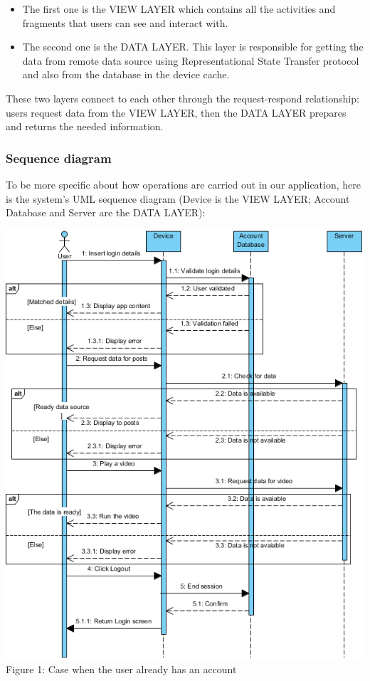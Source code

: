 \begin{itemize}
  \item The first one is the VIEW LAYER which contains all the activities and fragments that users can see and interact with.
  \item The second one is the DATA LAYER. This layer is responsible for getting the data from remote data source using Representational State Transfer protocol and also from the database in the device cache.
\end{itemize}

\vspace{0cm}These two layers connect to each other through the request-respond relationship: users request data from the VIEW LAYER, then the DATA LAYER prepares and returns the needed information.
\subsubsection{Sequence diagram}
\hspace{0.5cm}To be more specific about how operations are carried out in our application, here is the system’s UML sequence diagram (Device is the VIEW LAYER; Account Database and Server are the DATA LAYER):


\newpage
\vspace{5cm}
\begin{center}
    \includegraphics{Image/sequence_diagram.png}
    \\
    \caption{Figure 1: Case when the user already has an account}
\end{center}


